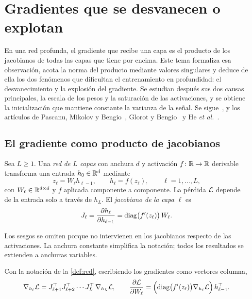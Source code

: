 \chapter{Gradientes que se desvanecen o explotan}
\label{tema:1}

En una red profunda, el gradiente que recibe una capa es el producto de los jacobianos de todas las capas que tiene por encima. Este tema formaliza esa observación, acota la norma del producto mediante valores singulares y deduce de ella los dos fenómenos que dificultan el entrenamiento en profundidad: el desvanecimiento y la explosión del gradiente. Se estudian después sus dos causas principales, la escala de los pesos y la saturación de las activaciones, y se obtiene la inicialización que mantiene constante la varianza de la señal. Se sigue~\cite[§8.2.5, §10.7]{gbc}, \cite[§5.4 y §9.7]{d2l} y los artículos de Pascanu, Mikolov y Bengio~\cite{pascanu}, Glorot y Bengio~\cite{glorot} y He \emph{et al.}~\cite{he-init}.

\section{El gradiente como producto de jacobianos}

\begin{definicion}\label{def:red}
Sea $L\ge 1$. Una \emph{red de $L$ capas} con anchura $d$ y activación $f\colon\mathbb{R}\to\mathbb{R}$ derivable transforma una entrada $h_0\in\mathbb{R}^{d}$ mediante
\[
z_\ell=W_\ell h_{\ell-1},\qquad h_\ell=f(z_\ell),\qquad \ell=1,\dots,L,
\]
con $W_\ell\in\mathbb{R}^{d\times d}$ y $f$ aplicada componente a componente. La pérdida $\mathcal{L}$ depende de la entrada solo a través de $h_L$. El \emph{jacobiano de la capa $\ell$} es
\[
J_\ell=\frac{\partial h_\ell}{\partial h_{\ell-1}}=\operatorname{diag}\bigl(f'(z_\ell)\bigr)\,W_\ell .
\]
\end{definicion}

Los sesgos se omiten porque no intervienen en los jacobianos respecto de las activaciones. La anchura constante simplifica la notación; todos los resultados se extienden a anchuras variables.

\begin{proposicion}\label{prop:grad-prof}
Con la notación de la \cref{def:red}, escribiendo los gradientes como vectores columna,
\[
\nabla_{h_{\ell}}\mathcal{L}=J_{\ell+1}^{\top} J_{\ell+2}^{\top}\cdots J_L^{\top}\,\nabla_{h_L}\mathcal{L},
\qquad
\frac{\partial\mathcal{L}}{\partial W_\ell}=\Bigl(\operatorname{diag}\bigl(f'(z_\ell)\bigr)\nabla_{h_\ell}\mathcal{L}\Bigr)\,h_{\ell-1}^{\top} .
\]
\end{proposicion}

